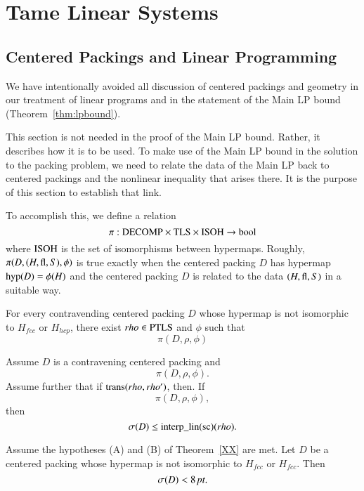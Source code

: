 \chapter{Tame Linear Systems}

\section{Centered Packings and Linear Programming}

We have intentionally avoided all discussion of centered packings
and geometry in our treatment of linear programs and in the
statement of the Main LP bound (Theorem~\ref{thm:lpbound}).

This section is not needed in the proof of the Main LP bound.
Rather, it describes how it is to be used.  To make use of the
Main LP bound in the solution to the packing problem, 
we need to relate the data
of the Main LP back to centered packings and the nonlinear
inequality that arises there.  It is the purpose of this section
to establish that link.

To accomplish this, we define a relation
    $$\pi:{\operatorname{DECOMP}}\times {\operatorname{TLS}}\times {\operatorname{ISOH}}
    \to\operatorname{bool}$$
where ${\operatorname{ISOH}}$ is the set of isomorphisms between hypermaps.
Roughly, $\pi(D,(H,{\operatorname{fl}},S),\phi)$ is true exactly when the
centered packing $D$ has hypermap ${\operatorname{hyp}}(D) =\phi(H)$ and the
centered packing $D$ is related to the data $(H,{\operatorname{fl}},S)$ in a
suitable way.

\begin{theorem}
For every contravending centered packing $D$
whose hypermap is not isomorphic to $H_{fcc}$ or $H_{hcp}$, there
exist $rho\in{\operatorname{PTLS}}$ and $\phi$ such that
    $$\pi(D,\rho,\phi)$$
\end{theorem}

\begin{theorem}
Assume $D$ is a contravening centered packing and
    $$
    \pi(D,\rho,\phi).
    $$
Assume further that if ${\operatorname{trans}}(rho,rho')$, then.
    If
    $$\pi(D,\rho,\phi),$$
    then
    $$\sigma(D) \le {\operatorname{interp\_lin}}({\operatorname{sc}})(rho).$$
\end{theorem}

\begin{corollary}
Assume the hypotheses (A) and (B) of Theorem~\ref{XX} are met.  Let $D$
be a centered packing whose hypermap is not isomorphic to
$H_{fcc}$ or $H_{fcc}$.  Then
    $$\sigma(D) < 8\,\hbox{\it pt}.$$
\end{corollary}

